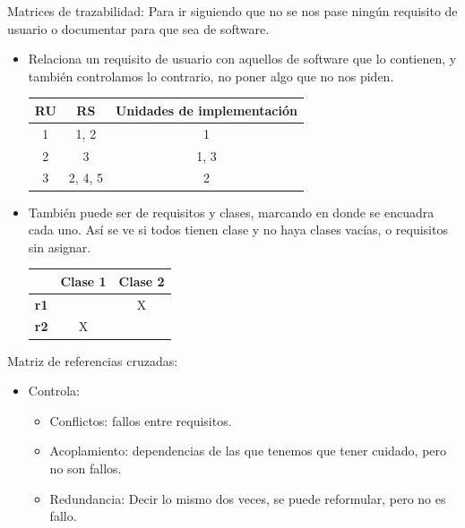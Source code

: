 \documentclass[12pt, twoside, openright]{report} %
\begin{document}
  Matrices de trazabilidad: Para ir siguiendo que no se nos pase ningún
  requisito de usuario o documentar para que sea de software. 
  

  \begin{itemize}
  \item  Relaciona un requisito de usuario con aquellos de software que lo
	contienen, y también controlamos lo contrario, no poner algo que no
	nos piden.

	\begin{table}[h]
		\begin{tabular}{|c|c|c|}
		\hline
		\textbf{RU} & \textbf{RS} & \textbf{Unidades de implementación} \\ \hline
		1           & 1, 2        & 1                                   \\ \hline
		2           & 3           & 1, 3                                \\ \hline
		3           & 2, 4, 5     & 2                                   \\ \hline
		\end{tabular}
		\end{table}

  \item
    También puede ser de requisitos y clases, marcando en donde se
    encuadra cada uno. Así se ve si todos tienen clase y no haya clases
    vacías, o requisitos sin asignar.

	\begin{table}[h]
		\begin{tabular}{c|c|c|}
		\cline{2-3}
										  & \textbf{Clase 1} & \textbf{Clase 2} \\ \hline
		\multicolumn{1}{|c|}{\textbf{r1}} &                  & X                \\ \hline
		\multicolumn{1}{|c|}{\textbf{r2}} & X                &                  \\ \hline
		\end{tabular}
		\end{table}

\end{itemize}
	Matriz de referencias cruzadas:

    \begin{itemize}
    
    \item
      Controla:

      \begin{itemize}
      
      \item
        Conflictos: fallos entre requisitos.
    \item
      Acoplamiento: dependencias de las que tenemos que tener cuidado,
      pero no son fallos.
      \item
        Redundancia: Decir lo mismo dos veces, se puede reformular, pero
        no es fallo.
      \end{itemize}
    \end{itemize}
\end{document}
